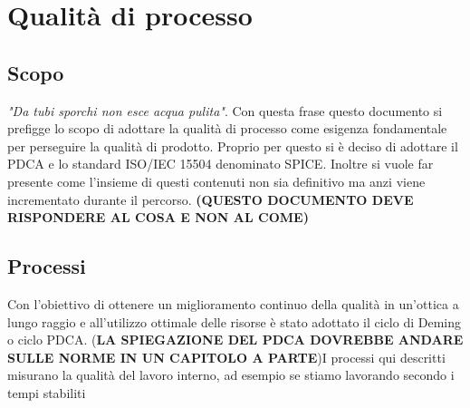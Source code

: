 \section{Qualità di processo}
\subsection{Scopo}
\textit{"Da tubi sporchi non esce acqua pulita"}.
\newline
Con questa frase questo documento si prefigge  lo scopo di adottare la qualità di processo come esigenza fondamentale per perseguire la qualità di prodotto. Proprio per questo si è deciso di adottare il PDCA e lo standard ISO/IEC 15504 denominato SPICE. Inoltre si vuole far presente come l'insieme di questi contenuti non sia definitivo ma anzi viene incrementato durante il percorso. \textbf{(QUESTO DOCUMENTO DEVE RISPONDERE AL COSA E NON AL COME)}
\subsection{Processi}
Con l'obiettivo di ottenere un miglioramento continuo della qualità in un'ottica a lungo raggio e all'utilizzo ottimale delle risorse è stato adottato il ciclo di Deming o ciclo PDCA. (\textbf{LA SPIEGAZIONE DEL PDCA DOVREBBE ANDARE SULLE NORME IN UN CAPITOLO A PARTE})\newline I processi qui descritti misurano la qualità del lavoro interno, ad esempio se stiamo lavorando secondo i tempi stabiliti

